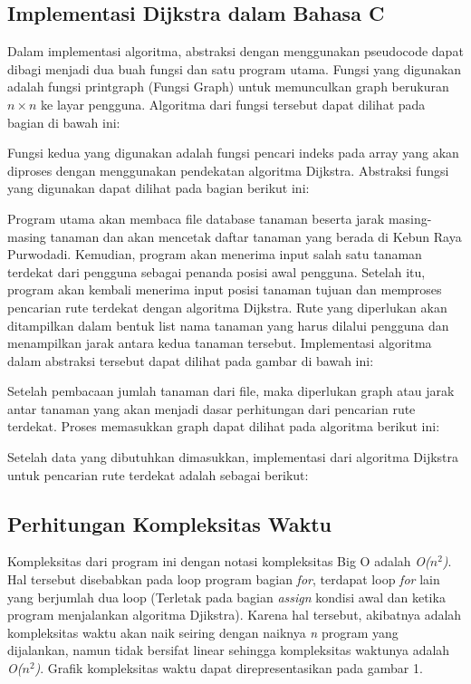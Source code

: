 \documentclass[conference]{IEEEtran}
\begin{document}
\subsection{Implementasi Dijkstra dalam Bahasa C}
Dalam implementasi algoritma, abstraksi dengan menggunakan pseudocode dapat dibagi menjadi dua buah fungsi dan satu program utama. Fungsi yang digunakan adalah fungsi printgraph (Fungsi Graph) untuk memunculkan graph berukuran $n \times n$ ke layar pengguna. Algoritma dari fungsi tersebut dapat dilihat pada bagian di bawah ini:

Fungsi kedua yang digunakan adalah fungsi pencari indeks pada array yang akan diproses dengan menggunakan pendekatan algoritma Dijkstra. Abstraksi fungsi yang digunakan dapat dilihat pada bagian berikut ini:

Program utama akan membaca ﬁle database tanaman beserta jarak masing-masing tanaman dan akan mencetak daftar tanaman yang berada di Kebun Raya Purwodadi. Kemudian, program akan menerima input salah satu tanaman terdekat dari pengguna sebagai penanda posisi awal pengguna. Setelah itu, program akan kembali menerima input posisi tanaman tujuan dan memproses pencarian rute terdekat dengan algoritma Dijkstra. Rute yang diperlukan akan ditampilkan dalam bentuk list nama tanaman yang harus dilalui pengguna dan menampilkan jarak antara kedua tanaman tersebut. Implementasi algoritma dalam abstraksi tersebut dapat dilihat pada gambar di bawah ini:

Setelah pembacaan jumlah tanaman dari ﬁle, maka diperlukan graph atau jarak antar tanaman yang akan menjadi dasar perhitungan dari pencarian rute terdekat. Proses memasukkan graph dapat dilihat pada algoritma berikut ini:

Setelah data yang dibutuhkan dimasukkan, implementasi dari algoritma Dijkstra untuk pencarian rute terdekat adalah sebagai berikut:

\subsection{Perhitungan Kompleksitas Waktu}
Kompleksitas dari program ini dengan notasi kompleksitas Big O adalah\textit{ O($n^2$)}. Hal tersebut disebabkan pada loop program bagian \textit{for}, terdapat loop \textit{for} lain yang berjumlah dua loop (Terletak pada bagian \textit{assign} kondisi awal dan ketika program menjalankan algoritma Djikstra). Karena hal tersebut, akibatnya adalah kompleksitas waktu akan naik seiring dengan naiknya \textit{n} program yang dijalankan, namun tidak bersifat linear sehingga kompleksitas waktunya adalah \textit{O($n^2$)}. Graﬁk kompleksitas waktu dapat direpresentasikan pada gambar 1.
\end{document}
